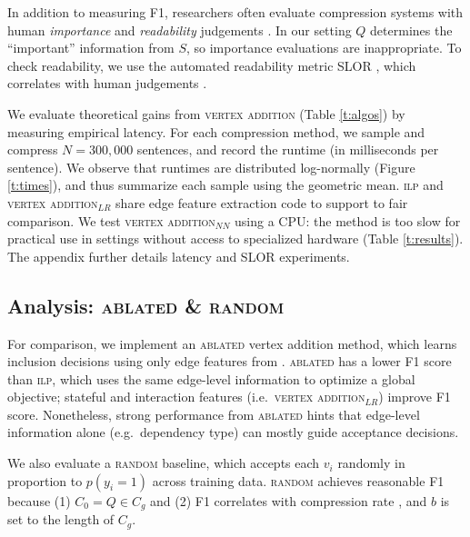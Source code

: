 \documentclass[11pt,a4paper]{article}
\begin{document}
{In addition to measuring F1, researchers often evaluate compression systems with human \textit{importance} and \textit{readability} judgements \cite{Knight2000StatisticsBasedS,filippova2015sentence}. In our setting $Q$ determines the ``important'' information from $S$, so importance evaluations are inappropriate. To check readability, we use the automated readability metric SLOR \cite{lau2015unsupervised}, which correlates with human judgements \cite{kannConl}. 

We evaluate theoretical gains from \textsc{vertex addition}  (Table \ref{t:algos}) by measuring empirical latency. For each compression method, we sample and compress $N=300,000$ sentences, and record the runtime (in milliseconds per sentence). We observe that runtimes are distributed log-normally (Figure \ref{t:times}), and thus summarize each sample using the geometric mean. \textsc{ilp} and \textsc{vertex addition}$_{LR}$ share edge feature extraction code to support to fair comparison. We test \textsc{vertex addition}$_{NN}$ using a CPU: the method is too slow for practical use in settings without access to specialized hardware (Table \ref{t:results}). The appendix further details latency and SLOR experiments.

\subsection{Analysis:  \textsc{ablated} \& \textsc{random}}\label{s:ablated}
For comparison, we implement an \textsc{ablated} vertex addition method, which learns inclusion decisions using only edge features from \citet{filippova2013overcoming}. \textsc{ablated} has a lower F1 score than \textsc{ilp}, which uses the same edge-level information to optimize a global objective; stateful and interaction features (i.e.\ \textsc{vertex addition}$_{LR}$) improve F1 score. Nonetheless, strong performance from \textsc{ablated} hints that edge-level information alone (e.g.\ dependency type) can mostly guide acceptance decisions.

We also evaluate a \textsc{random} baseline, which accepts each $v_i$ randomly in proportion to $p(y_i = 1)$ across training data. \textsc{random} achieves reasonable F1 because (1) $C_0 = Q \in C_g$ and (2) F1 correlates with compression rate \cite{napoles2011evaluating}, and $b$ is set to the length of $C_g$.


}
\end{document}
